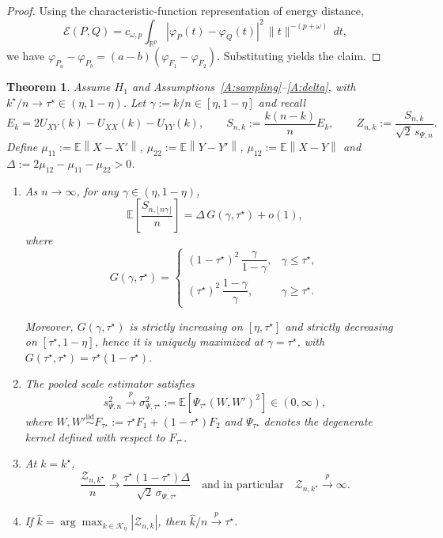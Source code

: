 \documentclass[11pt]{article}
\newtheorem{theorem}{Theorem}
\numberwithin{theorem}{section}
\numberwithin{Lemma}{section}
\numberwithin{Definition}{section}
\newcommand{\iid}{\stackrel{\text{iid}}{\sim}}
\newcommand{\EE}{\mathbb{E}}
\newcommand{\cp}{k^\star}
\newcommand{\tstar}{\tau^\star}
\newcommand{\Keta}{\mathcal{K}_\eta}
\newcommand{\norm}[1]{\left\lVert #1 \right\rVert}
\begin{document}
\begin{proof}
\sloppy Using the characteristic-function representation of energy distance,
$$\mathcal{E}(P,Q)=c_{\omega,p}\int_{\mathbb{R}^p}
|\varphi_P(t)-\varphi_Q(t)|^2\,\|t\|^{-(p+\omega)}\,dt,$$
we have $\varphi_{P_a}-\varphi_{P_b}=(a-b)(\varphi_{F_1}-\varphi_{F_2})$.
Substituting yields the claim.
\end{proof}


\begin{theorem}\label{theorem2}
Assume $H_1$ and Assumptions~\ref{A:sampling}–\ref{A:delta}, with $\cp/n\to\tstar\in(\eta,1-\eta)$.
Let $\gamma:=k/n\in[\eta,1-\eta]$ and recall
\[
E_k = 2U_{XY}(k)-U_{XX}(k)-U_{YY}(k),
\qquad
S_{n,k}:=\frac{k(n-k)}{n}E_k,
\qquad
Z_{n,k}:=\frac{S_{n,k}}{\sqrt{2}\,s_{\Psi,n}}.
\]
Define $\mu_{11}:=\EE\norm{X-X'}$, $\mu_{22}:=\EE\norm{Y-Y'}$, $\mu_{12}:=\EE\norm{X-Y}$ and
$\Delta:=2\mu_{12}-\mu_{11}-\mu_{22}>0$.

\begin{enumerate}
\item[(a)] As $n\to\infty$, for any $\gamma\in(\eta,1-\eta)$,
\[
\EE\!\left[\frac{S_{n,\lfloor n\gamma\rfloor}}{n}\right]
=
\Delta\,G(\gamma,\tstar) + o(1),
\]
where
\[
G(\gamma,\tstar)
=
\begin{cases}
(1-\tstar)^2\,\dfrac{\gamma}{1-\gamma}, & \gamma\le \tstar,\\[1.2ex]
(\tstar)^2\,\dfrac{1-\gamma}{\gamma}, & \gamma\ge \tstar.
\end{cases}
\]

Moreover, $G(\gamma,\tstar)$ is strictly increasing on $[\eta,\tstar]$ and strictly decreasing on $[\tstar,1-\eta]$,
hence it is uniquely maximized at $\gamma=\tstar$, with $G(\tstar,\tstar)=\tstar(1-\tstar)$.

\item[(b)] The pooled scale estimator satisfies
\[
s_{\Psi,n}^2 \xrightarrow{p} \sigma_{\Psi,\tstar}^2 := \EE\!\left[\Psi_{\tstar}(W,W')^2\right]\in(0,\infty),
\]
where $W,W'\iid F_{\tstar}:=\tstar F_1+(1-\tstar)F_2$ and $\Psi_{\tstar}$ denotes the degenerate kernel defined
with respect to $F_{\tstar}$.

\item[(c)] At $k=\cp$,
\[
\frac{\mathcal{Z}_{n,\cp}}{n} \xrightarrow{p}
\frac{\tstar(1-\tstar)\Delta}{\sqrt{2}\,\sigma_{\Psi,\tstar}}
\quad\text{and in particular}\quad
\mathcal{Z}_{n,\cp} \xrightarrow{p} \infty.
\]

\item[(d)]  If $\hat{k}=\arg\max_{k\in\Keta}|\mathcal{Z}_{n,k}|$, then $\hat{k}/n \xrightarrow{p} \tstar$.
\end{enumerate}
\end{theorem}
\end{document}
